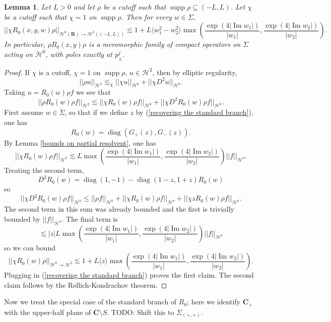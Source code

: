 \documentclass[reqno,12pt,letterpaper]{amsart}
\newcommand{\RR}{\mathbf{R}}
\newcommand{\CC}{\mathbf{C}}
\DeclareMathOperator{\diag}{diag}
\DeclareMathOperator{\supp}{supp}
\renewcommand{\Im}{\operatorname{Im}}
\newtheorem{lemma}[theorem]{Lemma}
\theoremstyle{definition}
\begin{document}
\begin{lemma}
\label{exponential bound on free resolvent}
Let $L > 0$ and let $\rho$ be a cutoff such that $\supp \rho \subseteq (-L, L)$.
Let $\chi$ be a cutoff such that $\chi = 1$ on $\supp \rho$.
Then for every $w \in \Sigma$,
$$||\chi R_0(x, y, w) \rho||_{\mathcal H^0(\RR) \to \mathcal H^2((-L, L))} \lesssim 1 + L\langle w_1^2 - w_2^2\rangle\max\left(\frac{\exp(4 |\Im w_1|)}{|w_1|}, \frac{\exp(4 |\Im w_2|)}{|w_2|} \right).$$
In particular, $\rho R_0(x, y) \rho$ is a meromorphic family of compact operators on $\Sigma$ acting on $\mathcal H^0$, with poles exactly at $p_\pm^j$.
\end{lemma}
\begin{proof}
If $\chi$ is a cutoff, $\chi = 1$ on $\supp \rho$, $u \in \mathcal H^2$, then by elliptic regularity,
$$||\rho u||_{\mathcal H^2} \lesssim_\chi ||\chi u||_{\mathcal H^0} + ||\chi D^2 u||_{\mathcal H^0}.$$
Taking $u = R_0(w)\rho f$ we see that
$$||\rho R_0(w)\rho f||_{\mathcal H^2} \lesssim ||\chi R_0(w) \rho f||_{\mathcal H^0} + ||\chi D^2 R_0(w) \rho f||_{\mathcal H^0}.$$
First assume $w \in \mathring \Sigma$, so that if we define $z$ by (\ref{recovering the standard branch}), one has
$$R_0(w) = \diag(G_+(z), G_-(z)).$$
By Lemma \ref{bounds on partial resolvent}, one has
$$||\chi R_0(w) \rho f||_{\mathcal H^0} \lesssim L \max\left(\frac{\exp(4 |\Im w_1|)}{|w_1|}, \frac{\exp(4 |\Im w_2|)}{|w_2|} \right) ||f||_{\mathcal H^0}.$$
Treating the second term,
$$D^2R_0(w) = \diag(1, - 1) - \diag(1-z,1+z)R_0(w)$$
so
$$||\chi D^2 R_0(w) \rho f||_{\mathcal H^0} \leq ||\rho f||_{\mathcal H^0} + ||\chi R_0(w) \rho f||_{\mathcal H^0} + ||\chi z R_0(w) \rho f||_{\mathcal H^0}.$$
The second term in this sum was already bounded and the first is trivially bounded by $||f||_{\mathcal H^0}$.
The final term is
$$\lesssim |z|L \max\left(\frac{\exp(4 |\Im w_1|)}{|w_1|}, \frac{\exp(4 |\Im w_2|)}{|w_2|} \right) ||f||_{\mathcal H^0}$$
so we can bound
$$||\chi R_0(w) \rho||_{\mathcal H^0 \to \mathcal H^2} \lesssim 1 + L\langle z\rangle\max\left(\frac{\exp(4 |\Im w_1|)}{|w_1|}, \frac{\exp(4 |\Im w_2|)}{|w_2|} \right).$$
Plugging in (\ref{recovering the standard branch}) proves the first claim.
The second claim follows by the Rellich-Kondrachov theorem.
\end{proof}

Now we treat the special case of the standard branch of $R_0$; here we identify $\CC_+$ with the upper-half plane of $\CC \setminus S$.
TODO: Shift this to $\Sigma_{(+, +)}$.
\end{document}
